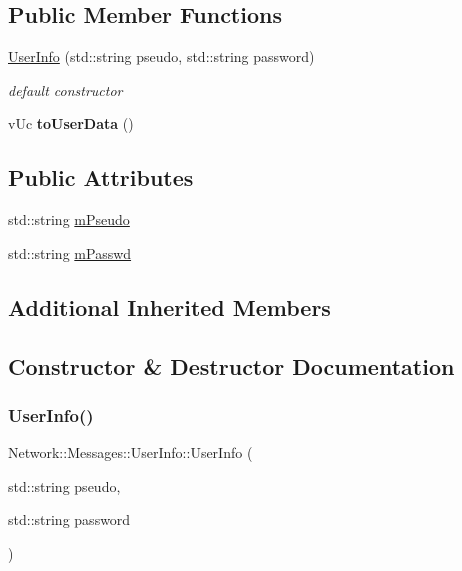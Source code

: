 \subsection*{Public Member Functions}
\begin{DoxyCompactItemize}
\item 
\hyperlink{class_network_1_1_messages_1_1_user_info_a01a9e627914ae65039625a9759d5d605}{User\+Info} (std\+::string pseudo, std\+::string password)
\begin{DoxyCompactList}\small\item\em default constructor \end{DoxyCompactList}\item 
\mbox{\label{class_network_1_1_messages_1_1_user_info_a45612cd78ddb81b644ad699e3da045cd}} 
v\+Uc {\bfseries to\+User\+Data} ()
\end{DoxyCompactItemize}
\subsection*{Public Attributes}
\begin{DoxyCompactItemize}
\item 
std\+::string \hyperlink{class_network_1_1_messages_1_1_user_info_a09407796713ff5ccab381df007b86b50}{m\+Pseudo}
\item 
std\+::string \hyperlink{class_network_1_1_messages_1_1_user_info_a5e6c0ce86a57dcd691bfaef89b85c04a}{m\+Passwd}
\end{DoxyCompactItemize}
\subsection*{Additional Inherited Members}


\subsection{Constructor \& Destructor Documentation}
\mbox{\label{class_network_1_1_messages_1_1_user_info_a01a9e627914ae65039625a9759d5d605}} 
\subsubsection{\texorpdfstring{User\+Info()}{UserInfo()}}
{\footnotesize\ttfamily Network\+::\+Messages\+::\+User\+Info\+::\+User\+Info (\begin{DoxyParamCaption}\item[{std\+::string}]{pseudo,  }\item[{std\+::string}]{password }\end{DoxyParamCaption})\hspace{0.3cm}{\ttfamily [inline]}}



